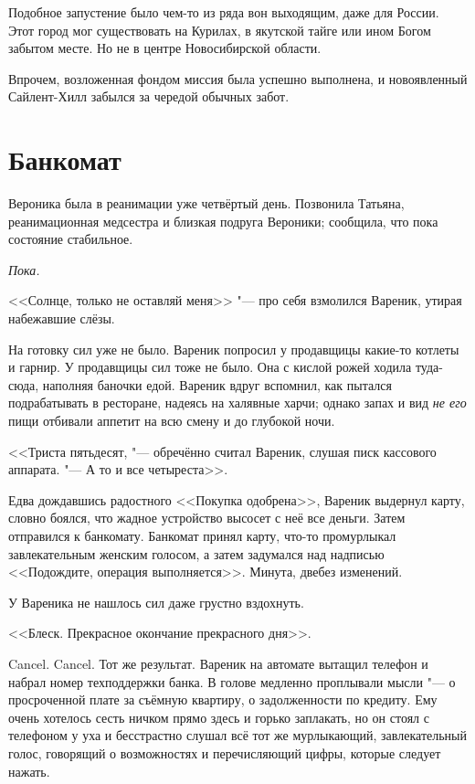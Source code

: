Подобное запустение было чем-то из ряда вон выходящим, даже для России.
Этот город мог существовать на Курилах, в якутской тайге или ином Богом забытом месте.
Но не в центре Новосибирской области.

Впрочем, возложенная фондом миссия была успешно выполнена, и новоявленный Сайлент-Хилл забылся за чередой обычных забот.

\section{\spacing}

\section{Банкомат}

Вероника была в реанимации уже четвёртый день.
Позвонила Татьяна, реанимационная медсестра и близкая подруга Вероники;
сообщила, что пока состояние стабильное.

\emph{Пока.}

<<Солнце, только не оставляй меня\ldotst>> "--- про себя взмолился Вареник, утирая набежавшие слёзы.

На готовку сил уже не было.
Вареник попросил у продавщицы какие-то котлеты и гарнир.
У продавщицы сил тоже не было.
Она с кислой рожей ходила туда-сюда, наполняя баночки едой.
Вареник вдруг вспомнил, как пытался подрабатывать в ресторане, надеясь на халявные харчи;
однако запах и вид \emph{не его} пищи отбивали аппетит на всю смену и до глубокой ночи. 

<<Триста пятьдесят, "--- обречённо считал Вареник, слушая писк кассового аппарата.
"--- А то и все четыреста>>.

Едва дождавшись радостного <<Покупка одобрена>>, Вареник выдернул карту, словно боялся, что жадное устройство высосет с неё все деньги.
Затем отправился к банкомату.
Банкомат принял карту, что-то промурлыкал завлекательным женским голосом, а затем задумался над надписью <<Подождите, операция выполняется>>.
Минута, две\ldotst без изменений.

У Вареника не нашлось сил даже грустно вздохнуть.

<<Блеск.
Прекрасное окончание прекрасного дня>>.

Cancel. Cancel.
Тот же результат.
Вареник на автомате вытащил телефон и набрал номер техподдержки банка.
В голове медленно проплывали мысли "--- о просроченной плате за съёмную квартиру, о задолженности по кредиту.
Ему очень хотелось сесть ничком прямо здесь и горько заплакать, но он стоял с телефоном у уха и бесстрастно слушал всё тот же мурлыкающий, завлекательный голос, говорящий о возможностях и перечисляющий цифры, которые следует нажать.

